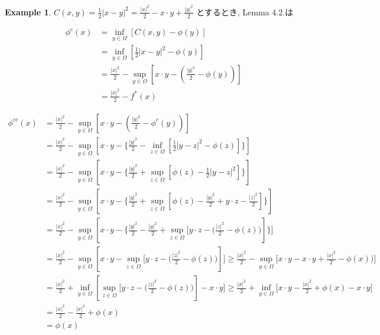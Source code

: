\documentclass{jsarticle}
\theoremstyle{definition}
\newtheorem{ex}{Example}[section]
\begin{document}
\begin{ex}



\begin{math}
C(x,y) = \frac{1}{2}|x-y|^2 = \frac{|x|^2}{2}-x \cdot y + \frac{|y|^2}{2}
\end{math}
とするとき,  Lemma 4.2.は

\begin{align*}
\phi^{c}(x) &= \displaystyle \inf_{y\in \Omega}{[C(x, y)-\phi (y)]} \\ 
            &= \displaystyle \inf_{y\in \Omega}{[\frac{1}{2}|x-y|^2 - \phi(y)]} \\
            &= \frac{|x|^2}{2} - \displaystyle \sup_{y\in \Omega}{[x \cdot y -( \frac{|y|^2}{2} - \phi(y))]} \\
            &= \frac{|x|^2}{2} - f^*(x)
\end{align*}



\begin{align*}
\phi^{cc}(x) &= \frac{|x|^2}{2} - \displaystyle \sup_{y\in \Omega}{[x \cdot y -( \frac{|y|^2}{2} - \phi^c(y))]} \\
             &= \frac{|x|^2}{2} - \displaystyle \sup_{y\in \Omega}{[x \cdot y -\{\frac{|y|^2}{2} - \displaystyle \inf_{z\in \Omega}{[\frac{1}{2}|y-z|^2 - \phi(z)]} \}]} \\
             &= \frac{|x|^2}{2} - \displaystyle \sup_{y\in \Omega}{[x \cdot y -\{\frac{|y|^2}{2} + \displaystyle \sup_{z\in \Omega}{[\phi(z) - \frac{1}{2}|y-z|^2]} \}]} \\
             &= \frac{|x|^2}{2} - \displaystyle \sup_{y\in \Omega}{[x \cdot y -\{\frac{|y|^2}{2} +  \displaystyle \sup_{z\in \Omega}{[\phi(z) - \frac{|y|^2}{2} + y \cdot z - \frac{|z|^2}{2}]} \}]} \\
             &= \frac{|x|^2}{2} - \displaystyle \sup_{y\in \Omega}{[x \cdot y -\{\frac{|y|^2}{2} - \frac{|y|^2}{2} +  \displaystyle \sup_{z\in \Omega}{[y \cdot z - (\frac{|z|^2}{2} - \phi(z)} )]\}]} \\
             &= \frac{|x|^2}{2} - \displaystyle \sup_{y\in \Omega}{[x \cdot y -  \displaystyle \sup_{z\in \Omega}{[y \cdot z - (\frac{|z|^2}{2} - \phi(z)} )]]} 
             \geq \frac{|x|^2}{2} - \displaystyle \sup_{y\in \Omega}{[x \cdot y - x \cdot y + \frac{|x|^2}{2} - \phi(x)} )] \\
             &= \frac{|x|^2}{2} + \displaystyle \inf_{y\in \Omega}{[ \displaystyle \sup_{z\in \Omega}{[y \cdot z - (\frac{|z|^2}{2} - \phi(z)} )]- x \cdot y]} 
             \geq \frac{|x|^2}{2} + \displaystyle \inf_{y\in \Omega}{[x \cdot y  - \frac{|x|^2}{2} + \phi(x)} - x \cdot y] \\
             &= \frac{|x|^2}{2} - \frac{|x|^2}{2} + \phi(x)\\
             &= \phi(x)
\end{align*}

\end{ex}
\end{document}

